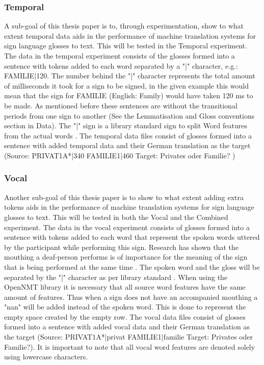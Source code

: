 \subsubsection{Temporal}

A sub-goal of this thesis paper is to, through experimentation, show to what extent temporal data aids in the performance of machine translation systems for sign language glosses to text. This will be tested in the Temporal experiment. The data in the temporal experiment consists of the glosses formed into a sentence with tokens added to each word separated by a "|" character, e.g.: FAMILIE|120. The number behind the "|" character represents the total amount of milliseconds it took for a sign to be signed, in the given example this would mean that the sign for FAMILIE (English: Family) would have taken 120 ms to be made. As mentioned before these sentences are without the transitional periods from one sign to another (See the Lemmatisation and Gloss conventions section in Data). The "|" sign is a library standard sign to split Word features from the actual words \cite{klein-etal-2017-opennmt}. The temporal data files consist of glosses formed into a sentence with added temporal data and their German translation as the target (Source: PRIVAT1A*|340 FAMILIE1|460 Target: Privates oder Familie? \cite{dgscorpus_3})

\subsubsection{Vocal}

Another sub-goal of this thesis paper is to show to what extent adding extra tokens aids in the performance of machine translation systems for sign language glosses to text. This will be tested in both the Vocal and the Combined experiment. The data in the vocal experiment consists of glosses formed into a sentence with tokens added to each word that represent the spoken words uttered by the participant while performing this sign. Research has shown that the mouthing a deaf-person performs is of importance for the meaning of the sign that is being performed at the same time \cite{kristoffersen2016designing}. The spoken word and the gloss will be separated by the "|" character as per library standard \cite{klein-etal-2017-opennmt}. When using the OpenNMT library \cite{klein-etal-2017-opennmt} it is necessary that all source word features have the same amount of features. Thus when a sign does not have an accompanied mouthing a "nan" will be added instead of the spoken word. This is done to represent the empty space created by the empty row. The vocal data files consist of glosses formed into a sentence with added vocal data and their German translation as the target (Source: PRIVAT1A*|privat FAMILIE1|familie Target: Privates oder Familie?). It is important to note that all vocal word features are denoted solely using lowercase characters.

